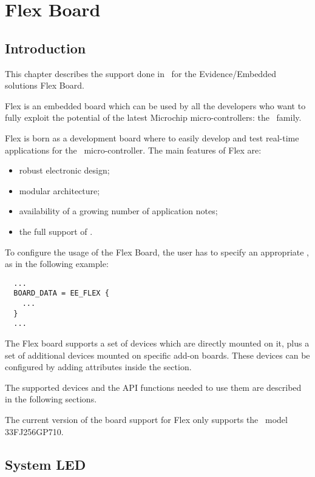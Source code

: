 \chapter[Flex Board]{Flex Board}

\section{Introduction}

This chapter describes the support done in \ee\ for the
Evidence/Embedded solutions Flex Board.

Flex is an embedded board which can be used by all the developers who
want to fully exploit the potential of the latest Microchip
micro-controllers: the \dspic\ family.

Flex is born as a development board where to easily develop and test
real-time applications for the \dspic\ micro-controller. The
main features of Flex are:
\begin{itemize}
\item robust electronic design;
\item modular architecture;
\item availability of a growing number of application notes;
\item the full support of \ee.
\end{itemize}

%
%

To configure the usage of the Flex Board, the user has to specify an
appropriate , as in the following example:

\begin{lstlisting}
  ...
  BOARD_DATA = EE_FLEX {
    ...
  }
  ...
\end{lstlisting}

The Flex board supports a set of devices which are directly mounted on
it, plus a set of additional devices mounted on specific add-on
boards. These devices can be configured by adding attributes inside
the  section.

The supported devices and the API functions needed to use them are
described in the following sections.

\begin{warning}
The current version of the board support for Flex only supports the
\dspic\ model 33FJ256GP710.
\end{warning}

\section{System LED}

